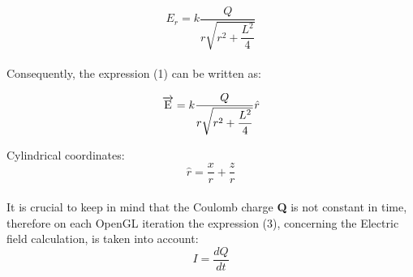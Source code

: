 \documentclass{article}
\begin{document}
		    \begin{equation*}
		    E_r = k \dfrac{Q}{r\sqrt{r^2 + \dfrac{L^2}{4}}}
		    \end{equation*}
		    
		    \paragraph{}
		    Consequently, the expression (1) can be written as:

		    \begin{equation}
		    \overrightarrow{\rm E} =  k \dfrac{Q}{r\sqrt{r^2 + \dfrac{L^2}{4}}} \hat{r}
		    \end{equation}		    
		    
		    Cylindrical coordinates:
		    \begin{equation*}
		    \hat{r} = \dfrac{x}{r} + \dfrac{z}{r}
		    \end{equation*}
		    
		    
		    \paragraph{}
		    It is crucial to keep in mind that the Coulomb charge \textbf{Q} is not constant in time, therefore on each OpenGL iteration the expression (3), concerning the Electric field calculation, is taken into account: 
		    \begin{equation*}
		    I = \dfrac{dQ}{dt}
		    \end{equation*}
		    
		    
		    
\end{document}
